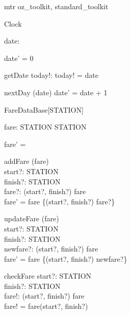 \documentclass[11pt]{article}
\begin{document}
\begin{zsection}
  \SECTION mtr \parents oz\_toolkit, standard\_toolkit
\end{zsection}

\zedsize{\small}
\begin{class}{Clock}
\also
\begin{state}
date:  \nat
\end{state}\classbreak
\begin{init}
date' = 0
\end{init}\classbreak
\begin{op}{getDate}
today!:  \nat  
\where
today! = date
\end{op}\classbreak
\begin{op}{nextDay}
\Delta (date)
\where
date' = date + 1
\end{op} 
\end{class} 

\begin{class}{FareDataBase[STATION]}
\also
\begin{state}
fare: STATION \cross STATION \pfun  \nat  
\end{state} \classbreak
\begin{init}
fare' = \emptyset
\end{init} \classbreak
\begin{op}{addFare}
\Delta (fare)\\
start?: STATION \\ 
finish?: STATION \\ 
fare?:  \nat  
\where
(start?, finish?) \notin  \dom fare \\ 
fare' = fare \cup \{(start?, finish?) \mapsto fare?\} \\ 
\end{op} \classbreak
\begin{op}{updateFare}
\Delta (fare)\\
start?: STATION \\ 
finish?: STATION \\ 
newfare?:  \nat  
\where
 (start?, finish?) \in  \dom fare \\ 
fare' = fare \oplus \{(start?, finish?) \mapsto newfare?\} \\ 
\end{op} \classbreak 
\begin{op}{checkFare}
start?: STATION \\ 
finish?: STATION \\ 
fare!:  \nat  
\where
 (start?, finish?) \in  \dom fare \\ 
fare! = fare(start?, finish?)
\end{op} 
\end{class} 
\end{document}
